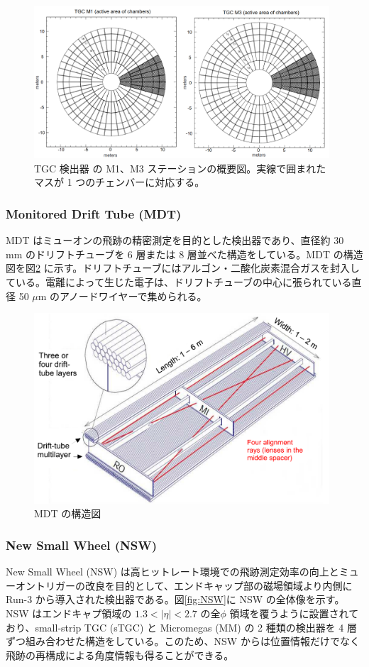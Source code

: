 \begin{figure}[tb]
  \centering
  \includegraphics[clip, width=11cm]{fig/2/TGC_octant.png}
  \caption{TGC 検出器 の M1、M3 ステーションの概要図。実線で囲まれたマスが 1 つのチェンバーに対応する。}
  \label{fig:TGC_oc}
\end{figure}

\subsubsection{Monitored Drift Tube (MDT)}
MDT はミューオンの飛跡の精密測定を目的とした検出器であり、直径約 30 mm のドリフトチューブを 6 層または 8 層並べた構造をしている。MDT の構造図を図\ref{fig:MDT} に示す。ドリフトチューブにはアルゴン・二酸化炭素混合ガスを封入している。電離によって生じた電子は、ドリフトチューブの中心に張られている直径 50 $\mu$m のアノードワイヤーで集められる。


\begin{figure}[tb]
  \centering
  \includegraphics[clip, width=11cm]{fig/2/MDT_chamber_schematics_2.pdf}
  \caption{MDT の構造図}
  \label{fig:MDT}
\end{figure}


\subsubsection{New Small Wheel (NSW)}
New Small Wheel (NSW) は高ヒットレート環境での飛跡測定効率の向上とミューオントリガーの改良を目的として、エンドキャップ部の磁場領域より内側に Run-3 から導入された検出器である。図\ref{fig:NSW}に NSW の全体像を示す。
NSW はエンドキャプ領域の $1.3 < |\eta| < 2.7$ の全$\phi$ 領域を覆うように設置されており、small-strip TGC (sTGC) と Micromegas (MM) の 2 種類の検出器を 4 層ずつ組み合わせた構造をしている。このため、NSW からは位置情報だけでなく飛跡の再構成による角度情報も得ることができる。

